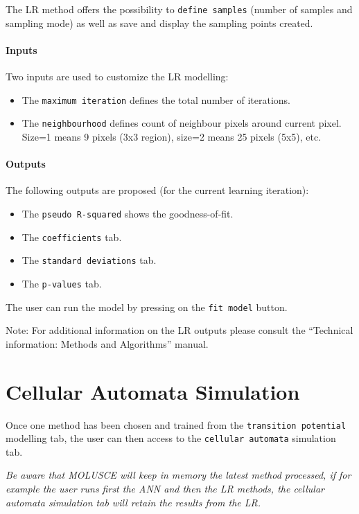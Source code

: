 \documentclass{report}
\begin{document}
The LR method offers the possibility to \verb+define samples+ (number of samples and sampling mode) as
well as save and display the sampling points created.

\paragraph{Inputs} Two inputs are used to customize the LR modelling:
\begin{itemize}
  \item The \verb+maximum iteration+ defines the total number of iterations.
  \item The \verb+neighbourhood+ defines count of neighbour pixels around current pixel. Size=1 means 9
pixels (3x3 region), size=2 means 25 pixels (5x5), etc.
\end{itemize}

\paragraph{Outputs} 

The following outputs are proposed (for the current learning iteration):

\begin{itemize}
  \item The \verb+pseudo R-squared+ shows the goodness-of-fit.
  \item The \verb+coefficients+ tab.
  \item The \verb+standard deviations+ tab.
  \item The \verb+p-values+ tab.
\end{itemize}

The user can run the model by pressing on the \verb+fit model+ button.

Note: For additional information on the LR outputs please consult the “Technical information:
Methods and Algorithms” manual.


\section{Cellular Automata Simulation}

Once one method has been chosen and trained from the \verb+transition potential+ modelling tab, 
the user can then access to the \verb+cellular automata+ simulation tab.

\emph{Be aware that MOLUSCE will keep in memory the
latest method processed, if for example the user runs first the ANN and then the LR methods, the
cellular automata simulation tab will retain the results from the LR.}
\end{document}
